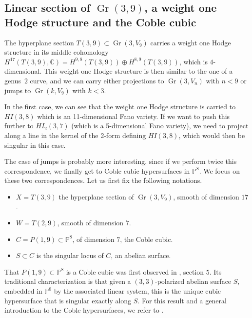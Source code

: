 \documentclass[11pt]{article}
\newcommand{\Subsection}{\subsection}
\theoremstyle{plain}
\theoremstyle{definition}
\DeclareMathOperator{\Gr}{Gr}
\newcommand{\CC}{\mathbb{C}}
\newcommand{\PP}{\mathbb{P}}
\begin{document}
\Subsection{Linear section of $\Gr(3,9)$, a weight one Hodge structure and the Coble cubic}\label{sect:coble}
The hyperplane section $T(3,9) \subset \Gr(3,V_9)$ carries a weight one Hodge structure in its middle cohomology
$H^{17}(T(3,9),\CC) = H^{9,8}(T(3,9)) \oplus H^{8,9}(T(3,9))$, which is $4$\nobreakdash-dimensional. This weight one Hodge structure
is then similar to the one of a genus~$2$ curve, and we can carry either projections to $\Gr(3,V_n)$ with
$n < 9$ or jumps to $\Gr(k,V_9)$ with $k < 3$.

In the first case, we can see that the weight one Hodge structure is carried to
$HI(3,8)$ which is an 11-dimensional Fano variety. If we want to push this further to
$HI_2(3,7)$ (which is a 5-dimensional Fano variety), we need to project along a line in the kernel of the 2-form defining $HI(3,8)$, which would then be singular in this case.

The case of jumps is probably more interesting, since if we perform twice this correspondence, we finally get
to Coble cubic hypersurfaces in $\PP^8$. We focus on these two correspondences. Let us first fix the
following notations.

\begin{itemize}
\item[] $X= T(3,9)$ the hyperplane section of $\Gr(3,V_9)$, smooth of dimension $17$.
\item[] $W=T(2,9)$, smooth of dimension $7$.
\item[] $C=P(1,9) \subset \PP^8$, of dimension $7$, the Coble cubic.
\item[] $S \subset C$ is the singular locus of $C$, an abelian surface.
\end{itemize}
That $P(1,9) \subset \PP^8$ is a Coble cubic was first observed in \cite{gsw}, section $5$.
Its traditional
characterization is that given a $(3,3)$-polarized abelian surface $S$, embedded in $\PP^8$
by the associated linear system, this is the unique cubic hypersurface that is singular
exactly along $S$. For this result and a general introduction to the Coble hypersurfaces,
we refer to \cite{beauville-coble}.
\end{document}
